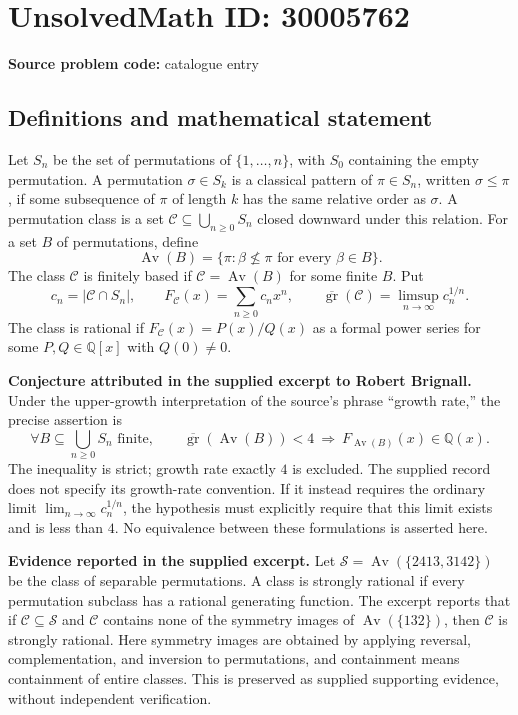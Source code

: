 \documentclass[11pt]{article}
\newcommand{\Q}{\mathbb{Q}}
\begin{document}
\section*{UnsolvedMath ID: 30005762}
\textbf{Source problem code:} catalogue entry
\subsection{Definitions and mathematical statement}
Let \(S_n\) be the set of permutations of \(\{1,\ldots,n\}\), with \(S_0\) containing the empty permutation. A permutation \(\sigma\in S_k\) is a classical pattern of \(\pi\in S_n\), written \(\sigma\leq\pi\), if some subsequence of \(\pi\) of length \(k\) has the same relative order as \(\sigma\). A permutation class is a set \(\mathcal C\subseteq\bigcup_{n\geq0}S_n\) closed downward under this relation. For a set \(B\) of permutations, define
\[
\operatorname{Av}(B)=\{\pi: \beta\nleq\pi\text{ for every }\beta\in B\}.
\]
The class \(\mathcal C\) is finitely based if \(\mathcal C=\operatorname{Av}(B)\) for some finite \(B\). Put
\[
c_n=|\mathcal C\cap S_n|,\qquad F_{\mathcal C}(x)=\sum_{n\geq0}c_nx^n,\qquad
\overline{\operatorname{gr}}(\mathcal C)=\limsup_{n\to\infty}c_n^{1/n}.
\]
The class is rational if \(F_{\mathcal C}(x)=P(x)/Q(x)\) as a formal power series for some \(P,Q\in\Q[x]\) with \(Q(0)\neq0\).

\textbf{Conjecture attributed in the supplied excerpt to Robert Brignall.} Under the upper-growth interpretation of the source's phrase ``growth rate,'' the precise assertion is
\[
\forall B\subseteq\bigcup_{n\geq0}S_n\text{ finite},\qquad
\overline{\operatorname{gr}}(\operatorname{Av}(B))<4
\ \Longrightarrow\ 
F_{\operatorname{Av}(B)}(x)\in\Q(x).
\]
The inequality is strict; growth rate exactly \(4\) is excluded. The supplied record does not specify its growth-rate convention. If it instead requires the ordinary limit \(\lim_{n\to\infty}c_n^{1/n}\), the hypothesis must explicitly require that this limit exists and is less than \(4\). No equivalence between these formulations is asserted here.

\textbf{Evidence reported in the supplied excerpt.} Let \(\mathcal S=\operatorname{Av}(\{2413,3142\})\) be the class of separable permutations. A class is strongly rational if every permutation subclass has a rational generating function. The excerpt reports that if \(\mathcal C\subseteq\mathcal S\) and \(\mathcal C\) contains none of the symmetry images of \(\operatorname{Av}(\{132\})\), then \(\mathcal C\) is strongly rational. Here symmetry images are obtained by applying reversal, complementation, and inversion to permutations, and containment means containment of entire classes. This is preserved as supplied supporting evidence, without independent verification.
\end{document}
